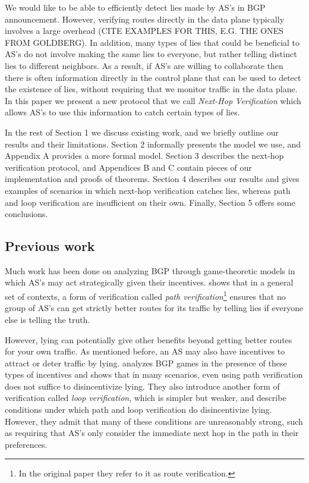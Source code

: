 \documentclass[12pt]{article}
\begin{document}
We would like to be able to efficiently detect lies made by AS's in BGP announcement. However, verifying routes directly in the data plane typically involves a large overhead (CITE EXAMPLES FOR THIS, E.G. THE ONES FROM GOLDBERG). In addition, many types of lies that could be beneficial to AS's do not involve making the same lies to everyone, but rather telling distinct lies to different neighbors. 
As a result, if AS's are willing to collaborate then there is often information directly in the control plane that can be used to detect the existence of lies, without requiring that we monitor traffic in the data plane. In this paper we present a new protocol that we call \emph{Next-Hop Verification} which allows AS's to use this information to catch certain types of lies.

In the rest of Section 1 we discuss existing work, and we briefly outline our results and their limitations. Section 2 informally presents the model we use, and Appendix A provides a more formal model. Section 3 describes the next-hop verification protocol, and Appendices B and C contain pieces of our implementation and proofs of theorems. Section 4 describes our results and gives examples of scenarios in which next-hop verification catches lies, whereas path and loop verification are insufficient on their own. Finally, Section 5 offers some conclusions.

\subsection{Previous work}
Much work has been done on analyzing BGP through game-theoretic models in which AS's may act strategically given their incentives. \cite{RoutingGames} shows that in a general set of contexts, a form of verification called \emph{path verification}\footnote{In the original paper they refer to it as route verification.}
ensures that no group of AS's can get strictly better routes for its traffic by telling lies if everyone else is telling the truth.

However, lying can potentially give other benefits beyond getting better routes for your own traffic. As mentioned before, an AS may also have incentives to attract or deter traffic by lying. \cite{Attraction} analyzes BGP games in the presence of these types of incentives and shows that in many scenarios, even using path verification does not suffice to disincentivize lying. They also introduce another form of verification called \emph{loop verification}, which is simpler but weaker, and describe conditions under which path and loop verification do disincentivize lying. However, they admit that many of these conditions are unreasonably strong, such as requiring that AS's only consider the immediate next hop in the path in their preferences.
\end{document}
